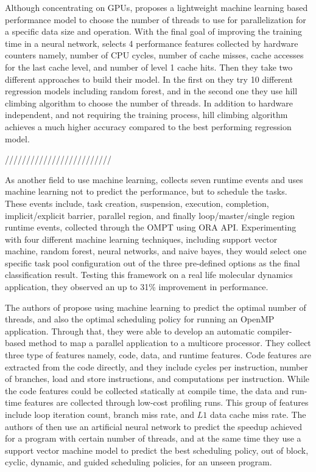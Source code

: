 Although concentrating on GPUs,	\cite{liu2018runtime} proposes a lightweight machine learning based performance model to choose the number of threads to use for parallelization for a specific data size and operation. With the final goal of improving the training time in a neural network, \cite{liu2018runtime} selects 4 performance features collected by hardware counters namely, number of CPU cycles, number of cache misses, cache accesses for the last cache level, and number of level 1 cache hits. Then they take two different approaches to build their model. In the first on they try 10 different regression models including random forest, and in the second one they use hill climbing algorithm to choose the number of threads. In addition to hardware independent, and not requiring the training process, hill climbing algorithm achieves a much higher accuracy compared to the best performing regression model.

/////////////////////////

As another field to use machine learning, \cite{qawasmeh2015adaptive} collects seven runtime events and uses machine learning not to predict the performance, but to schedule the tasks. These events include, task creation, suspension, execution, completion, implicit/explicit barrier, parallel region, and finally loop/master/single region runtime events, collected through the OMPT using ORA API. Experimenting with four different machine learning techniques, including support vector machine, random forest, neural networks, and naive bayes, they would select one specific task pool configuration out of the three pre-defined options as the final classification result. Testing this framework on a real life molecular dynamics application, they observed an up to 31\% improvement in performance. 

The authors of \cite{wang2009mapping} propose using machine learning to predict the optimal number of threads, and also the optimal scheduling policy for running an OpenMP application. Through that, they were able to develop an automatic compiler-based method to map a parallel application to a multicore processor. They collect three type of features namely, code, data, and runtime features. Code features are extracted from the code directly, and they include cycles per instruction, number of branches, load and store instructions, and computations per instruction. While the code features could be collected statically at compile time, the data and run-time features are collected through low-cost profiling runs. This group of features include loop iteration count, branch miss rate, and $L1$ data cache miss rate. The authors of \cite{wang2009mapping} then use an artificial neural network to predict the speedup achieved for a program with certain number of threads, and at the same time they use a support vector machine model to predict the best scheduling policy, out of block, cyclic, dynamic, and guided scheduling policies, for an unseen program.\\

